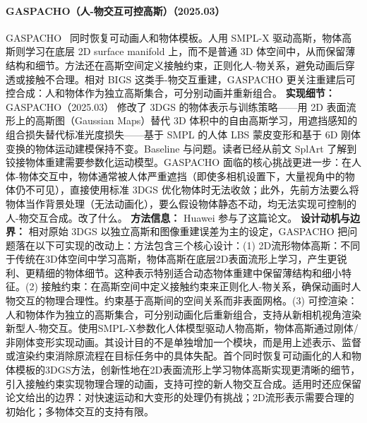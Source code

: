 \paragraph{GASPACHO（人-物交互可控高斯）（2025.03）}
GASPACHO~\cite{2503_09342} 同时恢复可动画人和物体模板。人用 SMPL-X 驱动高斯，物体高斯则学习在底层 2D surface manifold 上，而不是普通 3D 体空间中，从而保留薄结构和细节。方法还在高斯空间定义接触约束，正则化人-物关系，避免动画后穿透或接触不合理。相对 BIGS 这类手-物交互重建，GASPACHO 更关注重建后可控合成：人和物体作为独立高斯集合，可分别动画并重新组合。
\textbf{实现细节：} GASPACHO（2025.03） 修改了 3DGS 的物体表示与训练策略——用 2D 表面流形上的高斯图（Gaussian Maps）替代 3D 体积中的自由高斯学习，用遮挡感知的组合损失替代标准光度损失——基于 SMPL 的人体 LBS 蒙皮变形和基于 6D 刚体变换的物体运动建模保持不变。Baseline 与问题。读者已经从前文 SplArt 了解到铰接物体重建需要参数化运动模型。GASPACHO 面临的核心挑战更进一步：在人体-物体交互中，物体通常被人体严重遮挡（即使多相机设置下，大量视角中的物体仍不可见），直接使用标准 3DGS 优化物体时无法收敛；此外，先前方法要么将物体当作背景处理（无法动画化），要么假设物体静态不动，均无法实现可控制的人-物交互合成。改了什么。
\textbf{方法信息：} Huawei 参与了这篇论文。
\textbf{设计动机与边界：} 相对原始 3DGS 以独立高斯和图像重建误差为主的设定，GASPACHO 把问题落在以下可实现的改动上：方法包含三个核心设计：(1) 2D流形物体高斯：不同于传统在3D体空间中学习高斯，物体高斯在底层2D表面流形上学习，产生更锐利、更精细的物体细节。这种表示特别适合动态物体重建中保留薄结构和细小特征。(2) 接触约束：在高斯空间中定义接触约束来正则化人-物关系，确保动画时人物交互的物理合理性。约束基于高斯间的空间关系而非表面网格。(3) 可控渲染：人和物体作为独立的高斯集合，可分别动画化后重新组合，支持从新相机视角渲染新型人-物交互。使用SMPL-X参数化人体模型驱动人物高斯，物体高斯通过刚体/非刚体变形实现动画。其设计目的不是单独增加一个模块，而是用上述表示、监督或渲染约束消除原流程在目标任务中的具体失配。首个同时恢复可动画化的人和物体模板的3DGS方法，创新性地在2D表面流形上学习物体高斯实现更清晰的细节，引入接触约束实现物理合理的动画，支持可控的新人物交互合成。适用时还应保留论文给出的边界：对快速运动和大变形的处理仍有挑战；2D流形表示需要合理的初始化；多物体交互的支持有限。
